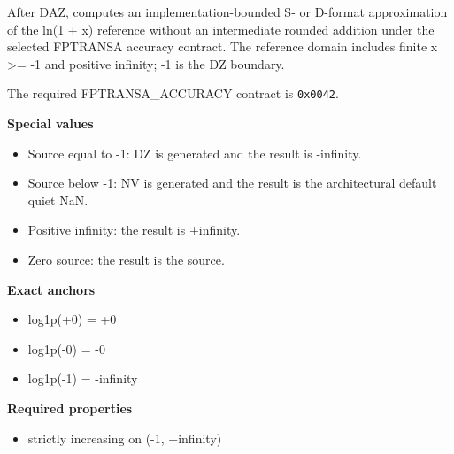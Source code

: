 After DAZ, computes an implementation-bounded S- or D-format approximation of the ln(1 + x) reference without an intermediate rounded addition under the selected FPTRANSA accuracy contract. The reference domain includes finite x \textgreater{}= -1 and positive infinity; -1 is the DZ boundary.

The required FPTRANSA\_ACCURACY contract is \texttt{0x0042}.

\textbf{Special values}\par
\begin{itemize}
\item Source equal to -1: DZ is generated and the result is -infinity.
\item Source below -1: NV is generated and the result is the architectural default quiet NaN.
\item Positive infinity: the result is +infinity.
\item Zero source: the result is the source.
\end{itemize}

\textbf{Exact anchors}\par
\begin{itemize}
\item log1p(+0) = +0
\item log1p(-0) = -0
\item log1p(-1) = -infinity
\end{itemize}

\textbf{Required properties}\par
\begin{itemize}
\item strictly increasing on (-1, +infinity)
\end{itemize}

